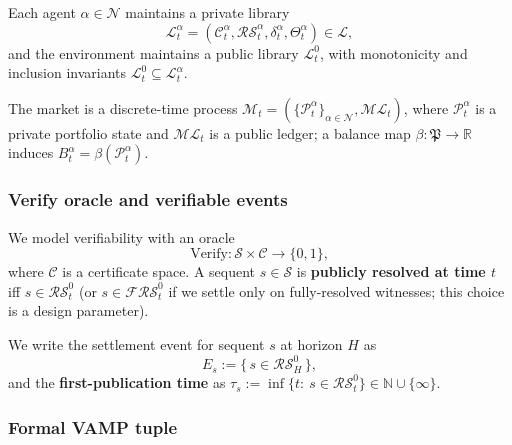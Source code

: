 Each agent \(\alpha\in\mathcal{N}\) maintains a private library
\[
\mathcal{L}_t^\alpha=(\mathcal{C}_t^\alpha,\mathcal{RS}_t^\alpha,\delta_t^\alpha,\Theta_t^\alpha)\in\mathscr{L},
\]
and the environment maintains a public library \(\mathcal{L}_t^0\), with monotonicity and inclusion invariants \(\mathcal{L}_t^0\subseteq \mathcal{L}_t^\alpha\).

The market is a discrete-time process \(\mathcal{M}_t=(\{\mathcal{P}_t^\alpha\}_{\alpha\in\mathcal{N}},\mathcal{ML}_t)\), where \(\mathcal{P}_t^\alpha\) is a private portfolio state and \(\mathcal{ML}_t\) is a public ledger; a balance map \(\beta:\mathfrak{P}\to\mathbb{R}\) induces \(B_t^\alpha=\beta(\mathcal{P}_t^\alpha)\).

\subsubsection{Verify oracle and verifiable events}

We model verifiability with an oracle
\[
\mathrm{Verify}:\mathcal{S}\times\mathcal{C}\to\{0,1\},
\]
where \(\mathcal{C}\) is a certificate space. A sequent \(s\in\mathcal{S}\) is \textbf{publicly resolved at time \(t\)} iff \(s\in\mathcal{RS}_t^0\) (or \(s\in\mathcal{FRS}_t^0\) if we settle only on fully-resolved witnesses; this choice is a design parameter).

We write the settlement event for sequent \(s\) at horizon \(H\) as
\[
E_s := \{\,s\in \mathcal{RS}_H^0\,\},
\]
and the \textbf{first-publication time} as \(\tau_s:=\inf\{t:\ s\in\mathcal{RS}_t^0\}\in\mathbb{N}\cup\{\infty\}\).

\subsubsection{Formal VAMP tuple}

